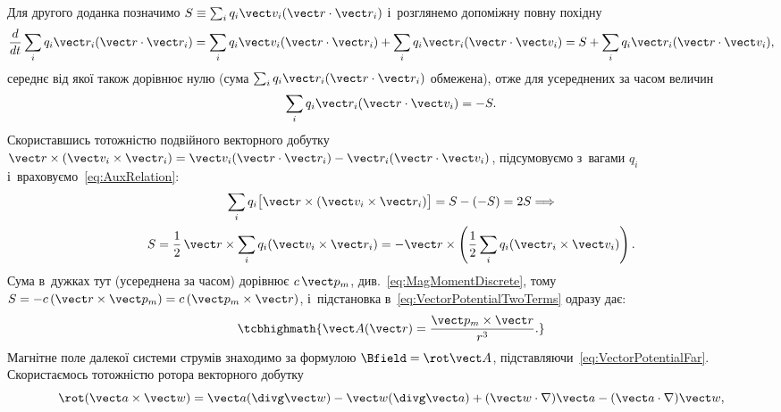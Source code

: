Для другого доданка позначимо $S \equiv \sum_i q_i\vect v_i(\vect r\cdot\vect r_i)$
і~розглянемо допоміжну повну похідну
\begin{equation*}
	\frac{d}{dt}\sum_i q_i\vect r_i(\vect r\cdot\vect r_i)
	= \sum_i q_i\vect v_i(\vect r\cdot\vect r_i) + \sum_i q_i\vect r_i(\vect r\cdot\vect v_i)
	= S + \sum_i q_i\vect r_i(\vect r\cdot\vect v_i),
\end{equation*}
середнє від якої також дорівнює нулю (сума $\sum_i q_i\vect r_i(\vect r\cdot\vect r_i)$
обмежена), отже для усереднених за часом величин
\begin{equation}\label{eq:AuxRelation}
	\sum_i q_i\vect r_i(\vect r\cdot\vect v_i) = -S.
\end{equation}
Скориставшись тотожністю подвійного векторного добутку $\vect r\times(\vect v_i\times\vect
	r_i) = \vect v_i(\vect r\cdot\vect r_i) - \vect r_i(\vect r\cdot\vect v_i)$, підсумовуємо
з~вагами $q_i$ і~враховуємо~\eqref{eq:AuxRelation}:
\begin{multline}
	\sum_i q_i\bigl[\vect r\times(\vect v_i\times\vect r_i)\bigr] = S - (-S) = 2S
	\Longrightarrow\\
	S = \frac12\,\vect r\times\sum_i q_i(\vect v_i\times\vect r_i) = -\vect r\times\left(\frac12\sum_i q_i(\vect r_i\times\vect v_i)\right).
\end{multline}
Сума в~дужках тут (усереднена за часом) дорівнює $c\,\vect p_m$, див.~\eqref{eq:MagMomentDiscrete}, тому $S = -c\,(\vect r\times\vect p_m) = c\,(\vect
	p_m\times\vect r)$, і~підстановка в~\eqref{eq:VectorPotentialTwoTerms} одразу дає:
\begin{equation}\label{eq:VectorPotentialFar}
	\tcbhighmath{
		\vect A(\vect r) = \frac{\vect p_m\times\vect r}{r^3}.
	}
\end{equation}
Магнітне поле далекої системи струмів знаходимо за формулою $\Bfield = \rot\vect A$,
підставляючи~\eqref{eq:VectorPotentialFar}. Скористаємось тотожністю ротора векторного
добутку
\begin{equation*}
	\rot(\vect a\times\vect w) = \vect a(\divg\vect w) - \vect w(\divg\vect a) + (\vect w\cdot\nabla)\vect a - (\vect a\cdot\nabla)\vect w,
\end{equation*}
